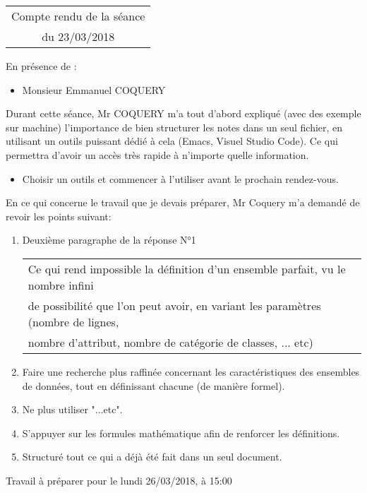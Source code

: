 \documentclass[a4paper, 11pt]{report}
\begin{document}
 
\begin{center}
\begin{tabular}{|c|}
\hline
Compte rendu de la séance \\du 23\//03\//2018\\
\hline

\end{tabular}
\end{center}


En présence de :\\
\begin{itemize}
\item Monsieur Emmanuel COQUERY
\end{itemize}
Durant cette séance, Mr COQUERY m'a tout d'abord expliqué (avec des exemple sur machine) l'importance de bien structurer les notes dans un seul fichier, en utilisant un outils puissant dédié à cela (Emacs, Visuel Studio Code). Ce qui permettra d'avoir un accès très rapide à n'importe quelle information.
\begin{itemize}
\item Choisir un outils et commencer à l'utiliser avant le prochain rendez-vous.
\end{itemize}
En ce qui concerne le travail que je devais préparer, Mr Coquery m'a demandé de revoir les points suivant:
\begin{enumerate}
\item Deuxième paragraphe de la réponse N°1
\begin{table}[h!]
\begin{center}
\begin{tabular}{|l|}
\hline 
\rowcolor{gray!25}
Ce qui rend impossible la définition d'un ensemble parfait, vu le nombre infini\\
\rowcolor{gray!25}
de possibilité que l'on peut avoir, en variant les paramètres (nombre de lignes,\\
\rowcolor{gray!25}
nombre d'attribut, nombre de catégorie de classes, ... etc)\\
\hline
\end{tabular}
\end{center}
\end{table}

\item Faire une recherche plus raffinée concernant les caractéristiques des ensembles de données, tout en définissant chacune (de manière formel).
\item Ne plus utiliser "...etc".
\item S'appuyer sur les formules mathématique afin de renforcer les définitions.
\item Structuré tout ce qui a déjà été fait dans un seul document.

\end{enumerate}

Travail à préparer pour le lundi 26/03/2018, à 15:00
\end{document}
